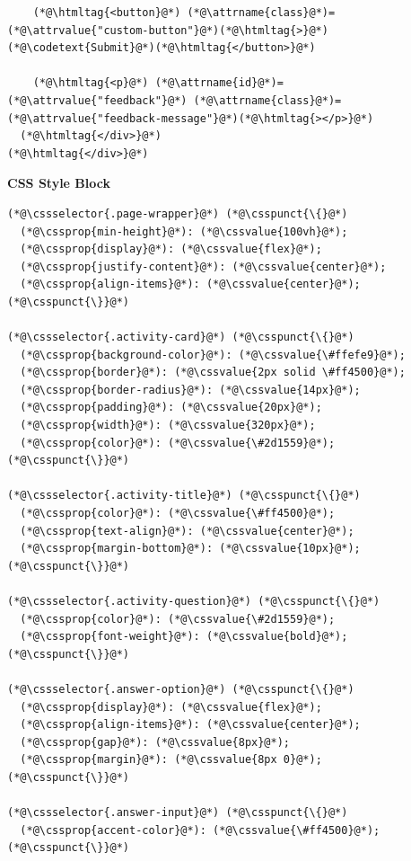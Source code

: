 \documentclass{article}
\begin{document}
\begin{minipage}[t]{0.48\textwidth}
\begin{lstlisting}
    (*@\htmltag{<button}@*) (*@\attrname{class}@*)=(*@\attrvalue{"custom-button"}@*)(*@\htmltag{>}@*)(*@\codetext{Submit}@*)(*@\htmltag{</button>}@*)

    (*@\htmltag{<p}@*) (*@\attrname{id}@*)=(*@\attrvalue{"feedback"}@*) (*@\attrname{class}@*)=(*@\attrvalue{"feedback-message"}@*)(*@\htmltag{></p>}@*)
  (*@\htmltag{</div>}@*)
(*@\htmltag{</div>}@*)
\end{lstlisting}

\end{minipage}
\hfill
\begin{minipage}[t]{0.48\textwidth}
  \textbf{\Bitter\textcolor{naranja}{CSS Style Block}}

  \vspace{0.15cm}

  \begin{lstlisting}
(*@\cssselector{.page-wrapper}@*) (*@\csspunct{\{}@*)
  (*@\cssprop{min-height}@*): (*@\cssvalue{100vh}@*);
  (*@\cssprop{display}@*): (*@\cssvalue{flex}@*);
  (*@\cssprop{justify-content}@*): (*@\cssvalue{center}@*);
  (*@\cssprop{align-items}@*): (*@\cssvalue{center}@*);
(*@\csspunct{\}}@*)

(*@\cssselector{.activity-card}@*) (*@\csspunct{\{}@*)
  (*@\cssprop{background-color}@*): (*@\cssvalue{\#ffefe9}@*);
  (*@\cssprop{border}@*): (*@\cssvalue{2px solid \#ff4500}@*);
  (*@\cssprop{border-radius}@*): (*@\cssvalue{14px}@*);
  (*@\cssprop{padding}@*): (*@\cssvalue{20px}@*);
  (*@\cssprop{width}@*): (*@\cssvalue{320px}@*);
  (*@\cssprop{color}@*): (*@\cssvalue{\#2d1559}@*);
(*@\csspunct{\}}@*)

(*@\cssselector{.activity-title}@*) (*@\csspunct{\{}@*)
  (*@\cssprop{color}@*): (*@\cssvalue{\#ff4500}@*);
  (*@\cssprop{text-align}@*): (*@\cssvalue{center}@*);
  (*@\cssprop{margin-bottom}@*): (*@\cssvalue{10px}@*);
(*@\csspunct{\}}@*)

(*@\cssselector{.activity-question}@*) (*@\csspunct{\{}@*)
  (*@\cssprop{color}@*): (*@\cssvalue{\#2d1559}@*);
  (*@\cssprop{font-weight}@*): (*@\cssvalue{bold}@*);
(*@\csspunct{\}}@*)

(*@\cssselector{.answer-option}@*) (*@\csspunct{\{}@*)
  (*@\cssprop{display}@*): (*@\cssvalue{flex}@*);
  (*@\cssprop{align-items}@*): (*@\cssvalue{center}@*);
  (*@\cssprop{gap}@*): (*@\cssvalue{8px}@*);
  (*@\cssprop{margin}@*): (*@\cssvalue{8px 0}@*);
(*@\csspunct{\}}@*)

(*@\cssselector{.answer-input}@*) (*@\csspunct{\{}@*)
  (*@\cssprop{accent-color}@*): (*@\cssvalue{\#ff4500}@*);
(*@\csspunct{\}}@*)


\end{lstlisting}
\end{minipage}
\end{document}
